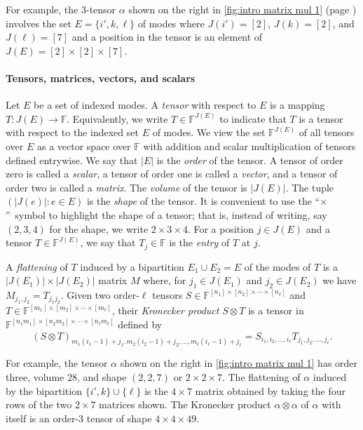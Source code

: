 \documentclass[11pt]{article}
\numberwithin{equation}{section}
\theoremstyle{definition}
\theoremstyle{plain}
\newcommand{\F}{\ensuremath{\mathbb{F}}}
\begin{document}
For example, the $3$-tensor $\alpha$ shown on the right 
in \eqref{fig:intro matrix mul 1} (page \pageref{fig:intro matrix mul 1})
involves the %
set $E = \{i', k, \ell\}$ of modes  %
where $J(i') = [2]$,
$J(k) = [2]$, and $J(\ell) = [7]$ and a position in the tensor is an
element of $J(E) = [2] \times [2] \times [7]$.

\paragraph*{Tensors, matrices, vectors, and scalars}

\label{sect:tensor-def}

Let $E$ be a set of indexed modes. A \emph{tensor} with respect to $E$ is
a mapping $T:J(E)\rightarrow \F$. Equivalently, we write $T\in\F^{J(E)}$
to indicate that $T$ is a tensor with respect to the
%
indexed set $E$ of modes.  %
We view the set $\F^{J(E)}$ of all tensors over $E$ as a vector space over $\F$
with addition and scalar multiplication of tensors defined entrywise.
%
We say that $|E|$ is the \emph{order} of the tensor.  A tensor of order
zero is called a \emph{scalar}, a tensor of order one is called a 
\emph{vector}, and a tensor of order two is called a \emph{matrix}.
%
The \emph{volume} of the tensor is $|J(E)|$. The tuple $(|J(e)|:e\in E)$
is the \emph{shape} of the tensor. It is convenient to use the
%
``$\times$''~symbol  %
to %
%
highlight  %
the shape of a tensor; that is,
instead of writing, say $(2,3,4)$ for the shape, we write $2\times 3\times 4$.
For a position $j\in J(E)$ and a tensor $T\in\F^{J(E)}$,
we say that $T_j\in\F$ is the \emph{entry} of $T$ at $j$.


A \emph{flattening} of $T$ induced by a bipartition
%
%
%
$E_1 \cup E_2 = E$
%
of the modes of $T$ is a $|J(E_1)| \times |J(E_2)|$ matrix $M$ where, for $j_1 \in J(E_1)$ and $j_2 \in J(E_2)$ we have $M_{j_1,j_2} = T_{j_1j_2}$.
Given two %
order-$\ell$  %
tensors $S \in \F^{[n_1] \times [n_2] \times \cdots \times [n_\ell]}$ and $T \in \F^{[m_1] \times [m_2] \times \cdots \times [m_\ell]}$, their \emph{Kronecker product} $S \otimes T$ is a tensor in $\F^{[n_1 m_1] \times [n_2 m_2] \times \cdots \times [n_\ell m_\ell]}$ defined by
$$
(S \otimes T)_{m_1(i_1-1)+j_1,m_2(i_2-1)+j_2,\ldots,m_\ell(i_\ell-1)+j_\ell} = S_{i_1,i_2,\ldots,i_\ell} T_{j_1,j_2,\ldots,j_\ell}.
$$

For example, the tensor $\alpha$ shown on the right in \eqref{fig:intro matrix mul 1} has
order three, volume $28$, and shape $(2,2,7)$ or $2 \times 2 \times
7$.  The flattening of $\alpha$ induced by the bipartition $\{i', k\}
\cup \{\ell\}$ is the $4 \times 7$ matrix obtained by taking the four
rows of the two $2\times7$ matrices shown.  The Kronecker product
$\alpha \otimes \alpha$ of $\alpha$ with itself is an
%
order-3   %
tensor of shape $4 \times 4 \times 49$.
\end{document}
